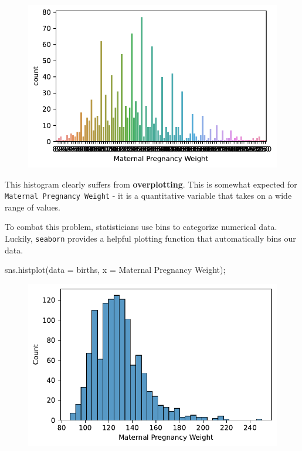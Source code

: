\documentclass[
  letterpaper,
  DIV=11,
  numbers=noendperiod]{scrreprt}
\newenvironment{Shaded}{\begin{snugshade}}{\end{snugshade}}
\newcommand{\NormalTok}[1]{\textcolor[rgb]{0.00,0.23,0.31}{#1}}
\newcommand{\OperatorTok}[1]{\textcolor[rgb]{0.37,0.37,0.37}{#1}}
\newcommand{\StringTok}[1]{\textcolor[rgb]{0.13,0.47,0.30}{#1}}
\begin{document}
\begin{figure}[H]

{\centering \includegraphics{visualization_1/visualization_1_files/figure-pdf/cell-7-output-1.pdf}

}

\end{figure}

This histogram clearly suffers from \textbf{overplotting}. This is
somewhat expected for \texttt{Maternal\ Pregnancy\ Weight} - it is a
quantitative variable that takes on a wide range of values.

To combat this problem, statisticians use bins to categorize numerical
data. Luckily, \texttt{seaborn} provides a helpful plotting function
that automatically bins our data.

\begin{Shaded}
\begin{Highlighting}[]
\NormalTok{sns.histplot(data }\OperatorTok{=}\NormalTok{ births, x }\OperatorTok{=} \StringTok{\textquotesingle{}Maternal Pregnancy Weight\textquotesingle{}}\NormalTok{)}\OperatorTok{;}
\end{Highlighting}
\end{Shaded}

\begin{figure}[H]

{\centering \includegraphics{visualization_1/visualization_1_files/figure-pdf/cell-8-output-1.pdf}

}

\end{figure}
\end{document}
